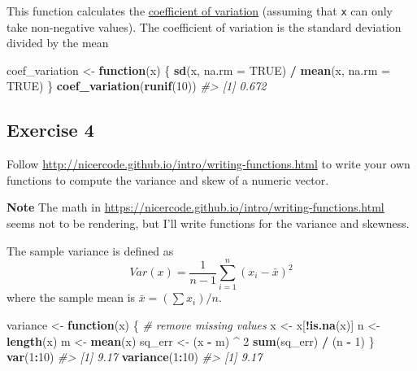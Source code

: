 \documentclass[]{book}
\newenvironment{Shaded}{\begin{snugshade}}{\end{snugshade}}
\newcommand{\CommentTok}[1]{\textcolor[rgb]{0.56,0.35,0.01}{\textit{#1}}}
\newcommand{\ControlFlowTok}[1]{\textcolor[rgb]{0.13,0.29,0.53}{\textbf{#1}}}
\newcommand{\DataTypeTok}[1]{\textcolor[rgb]{0.13,0.29,0.53}{#1}}
\newcommand{\DecValTok}[1]{\textcolor[rgb]{0.00,0.00,0.81}{#1}}
\newcommand{\KeywordTok}[1]{\textcolor[rgb]{0.13,0.29,0.53}{\textbf{#1}}}
\newcommand{\NormalTok}[1]{#1}
\newcommand{\OperatorTok}[1]{\textcolor[rgb]{0.81,0.36,0.00}{\textbf{#1}}}
\newcommand{\OtherTok}[1]{\textcolor[rgb]{0.56,0.35,0.01}{#1}}
\newcommand{\StringTok}[1]{\textcolor[rgb]{0.31,0.60,0.02}{#1}}
\theoremstyle{definition}
\theoremstyle{definition}
\theoremstyle{definition}
\theoremstyle{remark}
\begin{document}
This function calculates the
\href{https://en.wikipedia.org/wiki/Coefficient_of_variation}{coefficient
of variation} (assuming that \texttt{x} can only take non-negative
values). The coefficient of variation is the standard deviation divided
by the mean

\begin{Shaded}
\begin{Highlighting}[]
\NormalTok{coef_variation <-}\StringTok{ }\ControlFlowTok{function}\NormalTok{(x) \{}
  \KeywordTok{sd}\NormalTok{(x, }\DataTypeTok{na.rm =} \OtherTok{TRUE}\NormalTok{) }\OperatorTok{/}\StringTok{ }\KeywordTok{mean}\NormalTok{(x, }\DataTypeTok{na.rm =} \OtherTok{TRUE}\NormalTok{)}
\NormalTok{\}}
\KeywordTok{coef_variation}\NormalTok{(}\KeywordTok{runif}\NormalTok{(}\DecValTok{10}\NormalTok{))}
\CommentTok{#> [1] 0.672}
\end{Highlighting}
\end{Shaded}

\hypertarget{exercise-4-24}{%
\subsection{Exercise 4}\label{exercise-4-24}}

Follow \url{http://nicercode.github.io/intro/writing-functions.html} to
write your own functions to compute the variance and skew of a numeric
vector.

\textbf{Note} The math in
\url{https://nicercode.github.io/intro/writing-functions.html} seems not
to be rendering, but I'll write functions for the variance and skewness.

The sample variance is defined as \[
Var(x) = \frac{1}{n - 1} \sum_{i=1}^n (x_i - \bar{x}) ^2
\] where the sample mean is \(\bar{x} = (\sum x_i) / n\).

\begin{Shaded}
\begin{Highlighting}[]
\NormalTok{variance <-}\StringTok{ }\ControlFlowTok{function}\NormalTok{(x) \{}
  \CommentTok{# remove missing values}
\NormalTok{  x <-}\StringTok{ }\NormalTok{x[}\OperatorTok{!}\KeywordTok{is.na}\NormalTok{(x)]}
\NormalTok{  n <-}\StringTok{ }\KeywordTok{length}\NormalTok{(x)}
\NormalTok{  m <-}\StringTok{ }\KeywordTok{mean}\NormalTok{(x)}
\NormalTok{  sq_err <-}\StringTok{ }\NormalTok{(x }\OperatorTok{-}\StringTok{ }\NormalTok{m) }\OperatorTok{^}\StringTok{ }\DecValTok{2}
  \KeywordTok{sum}\NormalTok{(sq_err) }\OperatorTok{/}\StringTok{ }\NormalTok{(n }\OperatorTok{-}\StringTok{ }\DecValTok{1}\NormalTok{)}
\NormalTok{\}}
\KeywordTok{var}\NormalTok{(}\DecValTok{1}\OperatorTok{:}\DecValTok{10}\NormalTok{)}
\CommentTok{#> [1] 9.17}
\KeywordTok{variance}\NormalTok{(}\DecValTok{1}\OperatorTok{:}\DecValTok{10}\NormalTok{)}
\CommentTok{#> [1] 9.17}
\end{Highlighting}
\end{Shaded}
\end{document}
